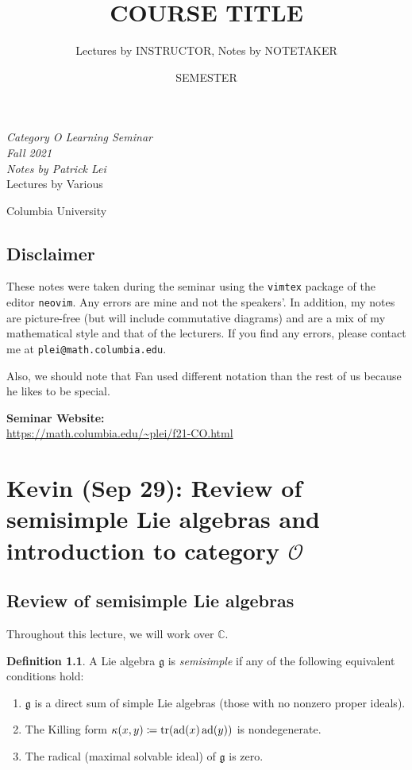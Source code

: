 \documentclass[leqno, openany]{memoir}
\title{COURSE TITLE}
\author{Lectures by INSTRUCTOR, Notes by NOTETAKER}
\date{SEMESTER}
\theoremstyle{definition}
\newtheorem{defn}[thm]{Definition}
\theoremstyle{remark}
\theoremstyle{plain}
\theoremstyle{definition}
\theoremstyle{remark}
\newcommand{\C}{\mathbb{C}}
\newcommand{\mc}[1]{\mathcal{#1}}
\newcommand{\mf}[1]{\mathfrak{#1}}
\DeclareMathOperator{\ad}{ad}
\newcommand*{\titleSW}
    {\begingroup%
    \raggedleft
    \vspace*{\baselineskip}
    {\Huge\itshape Category O Learning Seminar \\ Fall 2021}\\[\baselineskip]
    {\large\itshape Notes by Patrick Lei}\\[0.2\textheight]
    {\Large Lectures by Various}\par
    \vfill
    {\Large \sffamily Columbia University}
    \vspace*{\baselineskip}
\endgroup}
\begin{document}
    
\begin{titlingpage}
\titleSW
\end{titlingpage}

\thispagestyle{empty}
\section*{Disclaimer}%
\label{sec:disclaimer}

These notes were taken during the seminar using the \texttt{vimtex} package of
the editor \texttt{neovim}.  Any errors are mine and not the speakers'.  In
addition, my notes are picture-free (but will include commutative diagrams) and
are a mix of my mathematical style and that of the lecturers.  If you find any
errors, please contact me at \texttt{plei@math.columbia.edu}.

Also, we should note that Fan used different notation than the rest of us because he likes to be special. 

\vspace*{1cm}

\noindent\textbf{Seminar Website:}\\
\url{https://math.columbia.edu/~plei/f21-CO.html} \newpage

\tableofcontents

\chapter{Kevin (Sep 29): Review of semisimple Lie algebras and introduction to category $\mc{O}$}%
\label{cha:kevin_sep_29_review_of_semisimple_lie_algebras_and_introduction_to_category_o}

\section{Review of semisimple Lie algebras}%
\label{sec:review_of_semisimple_lie_algebras}

Throughout this lecture, we will work over $\C$. 

\begin{defn}
    A Lie algebra $\mf{g}$ is \textit{semisimple} if any of the following equivalent conditions hold:
    \begin{enumerate}
        \item $\mf{g}$ is a direct sum of simple Lie algebras (those with no nonzero proper ideals).
        \item The Killing form $\kappa(x,y) \coloneqq \tr (\ad(x) \ad(y))$ is nondegenerate.
        \item The radical (maximal solvable ideal) of $\mf{g}$ is zero.
    \end{enumerate}
\end{defn}
\end{document}
